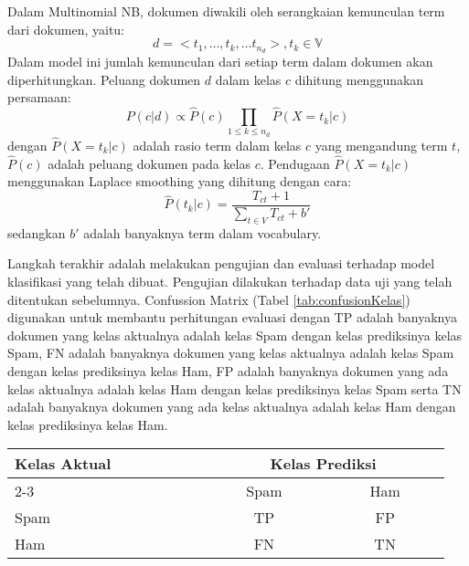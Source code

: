 Dalam Multinomial NB, dokumen diwakili oleh serangkaian kemunculan term dari dokumen, yaitu:
\begin{equation*}
d=<t_1, \dots, t_k, \dots t_{n_d} >, t_k\in \mathbb{V}
\end{equation*}
\noindent Dalam model ini jumlah kemunculan dari setiap term dalam dokumen akan diperhitungkan. Peluang dokumen $d$ dalam kelas $c$ dihitung menggunakan persamaan:
\begin{equation}
\label{eq:peluangNBmultinom}
P(c|d)\propto \hat{P}(c)\prod_{1\leq k\leq n_d}\hat{P}(X=t_k|c)
\end{equation}
\noindent dengan $\hat{P}(X=t_k|c)$ adalah rasio term dalam kelas $c$ yang mengandung term $t$, $\hat{P}(c)$ adalah peluang dokumen pada kelas $c$. Pendugaan $\hat{P}(X=t_k|c)$ menggunakan Laplace smoothing yang dihitung dengan cara:
\begin{equation}
\label{eq:laplaceMultinom}
\hat{P}(t_k|c)=\frac{T_{ct}+1}{\sum_{t\in V}T_{ct}+b'}
\end{equation}
\noindent sedangkan $b'$ adalah banyaknya term dalam vocabulary.

Langkah terakhir adalah melakukan pengujian dan evaluasi terhadap model klasifikasi yang telah dibuat. Pengujian dilakukan terhadap data uji yang telah ditentukan sebelumnya. Confussion Matrix (Tabel \ref{tab:confusionKelas}) digunakan untuk membantu perhitungan evaluasi dengan TP adalah banyaknya dokumen yang kelas aktualnya adalah kelas Spam dengan kelas prediksinya kelas Spam, FN adalah banyaknya dokumen yang kelas aktualnya adalah kelas Spam dengan kelas prediksinya kelas Ham, FP adalah banyaknya dokumen yang ada kelas aktualnya adalah kelas Ham dengan kelas prediksinya kelas Spam serta TN adalah banyaknya dokumen yang ada kelas aktualnya adalah kelas Ham dengan kelas prediksinya kelas Ham.
\begin{table*}[h!]
	\begin{center}
		\caption{Confussion Matrix kelas prediksi dan aktual}
		\label{tab:confusionKelas}
		\begin{tabular}{l c c}
			\hline
			\multirow{2}{*}{Kelas Aktual~~~~~~~~~~}&\multicolumn{2}{c}{Kelas Prediksi} \\
			\cline{2-3}
			&~~~~~Spam~~~~~&~~~~~Ham~~~~~\\
			\hline
			Spam&TP&FP\\
			Ham&FN&TN\\
			\hline
		\end{tabular}
	\end{center}
\end{table*}

